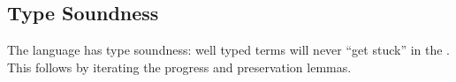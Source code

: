\subsection{Type Soundness}
 
The language has type soundness: well typed terms will never ``get stuck'' in the \slang{}.
This follows by iterating the progress and preservation lemmas.
 

 
 
 
 
 
 
 
 
 
 
 

